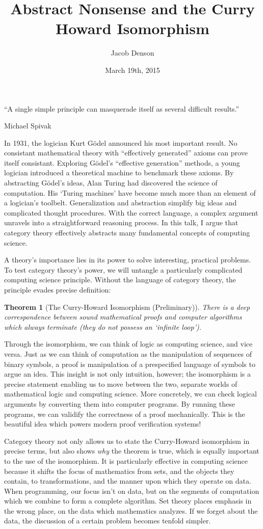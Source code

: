 \documentclass{article}
\title{Abstract Nonsense and the Curry Howard Isomorphism}
\author{Jacob Denson}
\date{March 19th, 2015}
\theoremstyle{plain}
\newtheorem{theorem}{Theorem}
\begin{document}
\maketitle

\epigraph{``A single simple principle can masquerade itself as several difficult results.''}{Michael Spivak}

In 1931, the logician Kurt G\"{o}del announced his most important result. No consistant mathematical theory with ``effectively generated'' axioms can prove itself consistant. Exploring G\"{o}del's  ``effective generation'' methods, a young logician introduced a theoretical machine to benchmark these axioms. By abstracting G\"{o}del's ideas, Alan Turing had discovered the science of computation. His `Turing machines' have become much more than an element of a logician's toolbelt. Generalization and abstraction simplify big ideas and complicated thought procedures. With the correct language, a complex argument unravels into a straightforward reasoning process. In this talk, I argue that category theory effectively abstracts many fundamental concepts of computing science.

A theory's importance lies in its power to solve interesting, practical problems. To test category theory's power, we will untangle a particularly complicated computing science principle. Without the language of category theory, the principle evades precise definition:

\begin{theorem}[The Curry-Howard Isomorphism (Preliminary)]
    There is a deep correspondence between sound mathematical proofs and computer algorithms which always terminate (they do not possess an `infinite loop').
\end{theorem}

Through the isomorphism, we can think of logic as computing science, and vice versa. Just as we can think of computation as the manipulation of sequences of binary symbols, a proof is manipulation of a prespecified language of symbols to argue an idea. This insight is not only intuition, however; the isomorphism is a precise statement enabling us to move between the two, separate worlds of mathematical logic and computing science. More concretely, we can check logical arguments by converting them into computer programs. By running these programs, we can validify the correctness of a proof mechanically. This is the beautiful idea which powers modern proof verification systems!

Category theory not only allows us to state the Curry-Howard isomorphism in precise terms, but also shows {\it why} the theorem is true, which is equally important to the use of the isomorphism. It is particularly effective in computing science because it shifts the focus of mathematics from sets, and the objects they contain, to transformations, and the manner upon which they operate on data. When programming, our focus isn't on data, but on the segments of computation which we combine to form a complete algorithm. Set theory places emphasis in the wrong place, on the data which mathematics analyzes. If we forget about the data, the discussion of a certain problem becomes tenfold simpler.
\end{document}
